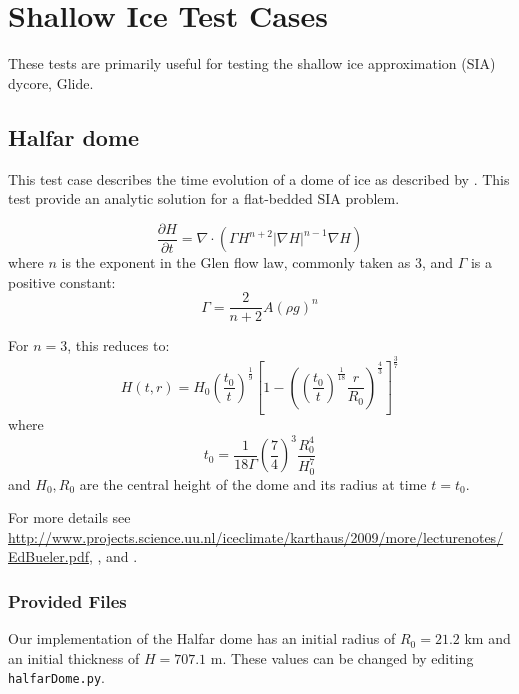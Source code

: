 
\section{Shallow Ice Test Cases}

These tests are primarily useful for testing the shallow ice approximation (SIA) dycore, Glide.


\subsection{Halfar dome}

\label{sec:halfar_description}
This test case describes the time evolution of a dome of ice as described by \citet{Halfar1983}.
This test provide an analytic solution for a flat-bedded SIA problem.

\begin{equation}
    \label{halfar}
    \frac{\partial H}{\partial t} = \nabla \cdot (\Gamma H^{n+2} |\nabla H|^{n-1} \nabla H)
\end{equation}
where $n$ is the exponent in the Glen flow law, commonly taken as 3, and $\Gamma$ is a positive constant:
\begin{equation}
    \Gamma = \frac{2}{n+2} A (\rho g)^n
\end{equation}

For $n=3$, this reduces to:
\begin{equation}
    H(t,r) = H_0 \left(\frac{t_0}{t}\right)^\frac{1}{9}  \left[ 1 - \left(  \left( \frac{t_0}{t} \right) ^ \frac{1}{18} \frac{r}{R_0} \right)^\frac{4}{3} \right] ^ \frac{3}{7}
\end{equation}
where
\begin{equation}
    t_0 = \frac{1}{18\Gamma} \left( \frac{7}{4} \right)^3 \frac{R_0^4}{H_0^7}
\end{equation}
and $H_0, R_0$ are the central height of the dome and its radius at time $t=t_0$.

For more details see \url{http://www.projects.science.uu.nl/iceclimate/karthaus/2009/more/lecturenotes/EdBueler.pdf},  \citet{Bueler2005}, and \citet{Halfar1983}.



\subsubsection{Provided Files}
\label{subsec:halfar_files}

Our implementation of the Halfar dome has an initial radius of $R_0=21.2$ km and an initial thickness of $H=707.1$ m.
These values can be changed by editing \texttt{halfarDome.py}.

